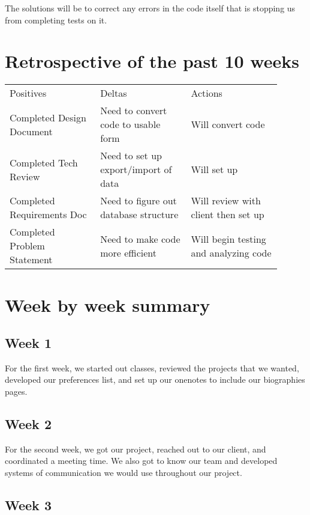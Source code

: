 \documentclass[onecolumn, draftclsnofoot,10pt, compsoc]{IEEEtran}
\begin{document}
The solutions will be to correct any errors in the code itself that is stopping us from completing tests on it.

\section{Retrospective of the past 10 weeks}

\begin{center}
\begin{tabular}{ p{0.3\linewidth} p{0.3\linewidth} p{0.3\linewidth} }
 Positives & Deltas & Actions \\
 Completed Design Document  & Need to convert code to usable form & Will convert code \\
 Completed Tech Review & Need to set up export/import of data & Will set up \\
 Completed Requirements Doc & Need to figure out database structure & Will review with client then set up \\
 Completed Problem Statement & Need to make code more efficient & Will begin testing and analyzing code
\end{tabular}
\end{center}

\section{Week by week summary}

\subsection{Week 1}

For the first week, we started out classes, reviewed the projects that we wanted, developed our preferences list, and set up our onenotes to include our biographies pages.

\subsection{Week 2}

For the second week, we got our project, reached out to our client, and coordinated a meeting time. We also got to know our team and developed systems of communication we would use throughout our project.

\subsection{Week 3}
\end{document}

